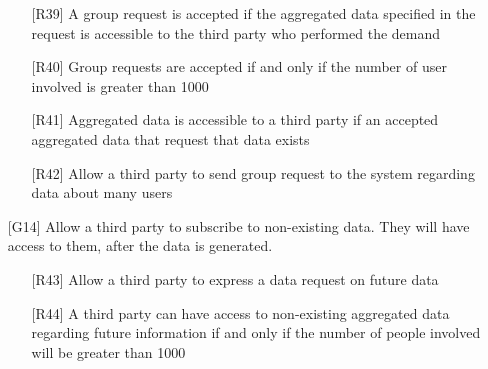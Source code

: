 \begin{itemize}
	\begin{itemize}
	\item[{[R39]}] A group request is accepted if the aggregated data specified in the request is accessible to the third party who performed the demand
	\item[{[R40]}] Group requests are accepted if and only if the number of user involved is greater than 1000
	\item[{[R41]}] Aggregated data is accessible to a third party if an accepted aggregated data that request that data exists
	\item[{[R42]}] Allow a third party to send group request to the system regarding data about many users
	\end{itemize}
\item[{[G14]}] Allow a third party to subscribe to non-existing data. They will have access to them, after the data is generated. 
	\begin{itemize}
	\item[{[R43]}] Allow a third party to express a data request on future data
	\item[{[R44]}] A third party can have access to non-existing aggregated data regarding future information if and only if the number of people involved will be greater than 1000
	\end{itemize}
\end{itemize}




